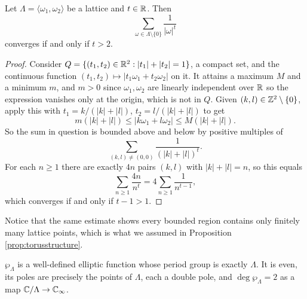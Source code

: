 \documentclass[a4paper]{scrartcl}
\newcommand{\genby}[1]{\langle #1 \rangle}
\newcommand{\Cinf}{\C_\infty}
\begin{document}
\begin{lemma}\label{lem:latticesum}
	Let $\Lambda = \genby{\omega_1,\omega_2}$ be a lattice and $t \in \mathbb{R}$. Then
	$$
	\sum_{\omega\in\Lambda\setminus\{0\}}\frac{1}{|\omega|^t}
	$$
	converges if and only if $t > 2$.
\end{lemma}

\begin{proof}
	Consider $Q = \{(t_1,t_2)\in\mathbb{R}^2 : |t_1| + |t_2| = 1\}$, a compact set, and the
	continuous function $(t_1,t_2)\mapsto |t_1\omega_1 + t_2\omega_2|$ on it. It attains a
	maximum $M$ and a minimum $m$, and $m > 0$ since $\omega_1, \omega_2$ are linearly
	independent over $\mathbb{R}$ so the expression vanishes only at the origin, which is not in
	$Q$. Given $(k,l) \in \mathbb{Z}^2\setminus\{0\}$, apply this with
	$t_1 = k/(|k|+|l|)$, $t_2 = l/(|k|+|l|)$ to get
	$$
	m(|k|+|l|) \leq |k\omega_1 + l\omega_2| \leq M(|k|+|l|).
	$$
	So the sum in question is bounded above and below by positive multiples of
	$$
	\sum_{(k,l)\neq(0,0)}\frac{1}{(|k|+|l|)^t}.
	$$
	For each $n \geq 1$ there are exactly $4n$ pairs $(k,l)$ with $|k|+|l| = n$, so this
	equals
	$$
	\sum_{n\geq 1}\frac{4n}{n^t} = 4\sum_{n\geq1}\frac{1}{n^{t-1}},
	$$
	which converges if and only if $t - 1 > 1$.
\end{proof}

Notice that the same estimate shows every bounded region contains only finitely many
lattice points, which is what we assumed in Proposition \ref{prop:torusstructure}.

\begin{theorem}\label{thm:wp}
	$\wp_\Lambda$ is a well-defined elliptic function whose period group is exactly
	$\Lambda$. It is even, its poles are precisely the points of $\Lambda$, each a double
	pole, and $\deg\wp_\Lambda = 2$ as a map $\C/\Lambda\to\Cinf$.
\end{theorem}
\end{document}
